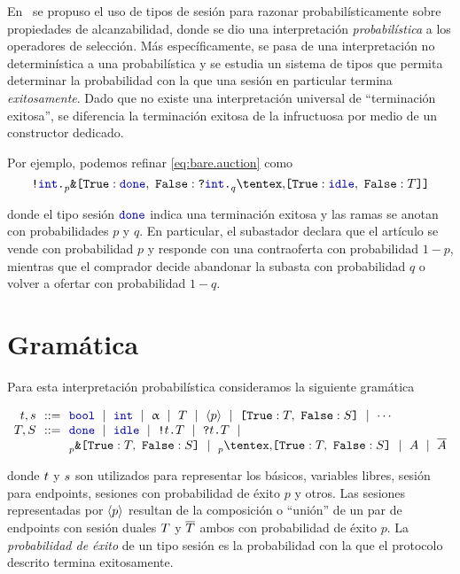 En~\cite{DBLP:conf/concur/InversoMPTT20} se propuso el uso de tipos de sesión
para razonar probabilísticamente sobre propiedades de alcanzabilidad, donde se
dio una interpretación \emph{probabilística} a los operadores de selección. Más
específicamente, se pasa de una interpretación no determinística a una
probabilística y se estudia un sistema de tipos que permita determinar la
probabilidad con la que una sesión en particular termina \emph{exitosamente}.
Dado que no existe una interpretación universal de ``terminación exitosa'', se
diferencia la terminación exitosa de la infructuosa por medio de un constructor
dedicado.

Por ejemplo, podemos refinar \eqref{eq:bare.auction} como
\begin{equation}
    \label{eq:refined.auction}
    \Out\tint{
        \BinaryPBranch[p]\Done{
            \In\tint{
                \BinaryPChoice[q]\Idle\T
            }
        }
    }
\end{equation}

donde el tipo sesión $\Done$ indica una terminación exitosa y las
ramas se anotan con probabilidades $p$ y $q$. En particular, el subastador
declara que el artículo se vende con probabilidad $p$ y responde con una
contraoferta con probabilidad $1-p$, mientras que el comprador decide abandonar
la subasta con probabilidad $q$ o volver a ofertar con probabilidad $1-q$.

\section{Gramática}

Para esta interpretación probabilística consideramos la siguiente gramática

\[
\begin{array}{@{}r@{~~}c@{~~}l@{}}
\TypeT, \TypeS & ::= &
\tbool
\rulemid \tint
\rulemid \tvar
\rulemid \SessionType
\rulemid \ClosedSessionType
\rulemid \BinaryLabels{\SessionTypeT}{\SessionTypeS}
\rulemid \cdots
\\
\SessionTypeT, \SessionTypeS & ::= &
\Done
\rulemid \Idle
\rulemid \Out\Type\SessionType
\rulemid \In\Type\SessionType
\rulemid
\\
	& &
\BinaryPBranch[p]\SessionTypeT\SessionTypeS
\rulemid \BinaryPChoice[p]\SessionTypeT\SessionTypeS
\rulemid \etvarA
\rulemid \dual\etvarA
\end{array}
\]

donde $t$ y $s$ son utilizados para representar los  básicos,
variables libres, sesión para endpoints, sesiones con probabilidad de
éxito $p$ y otros. Las sesiones representadas por $\langle p \rangle$ resultan
de la composición o ``unión'' de un par de endpoints con sesión duales
$T$ y $\overline{T}$ ambos con probabilidad de éxito $p$. La
\emph{probabilidad de éxito} de un tipo sesión es la probabilidad con la que
el protocolo descrito termina exitosamente.

